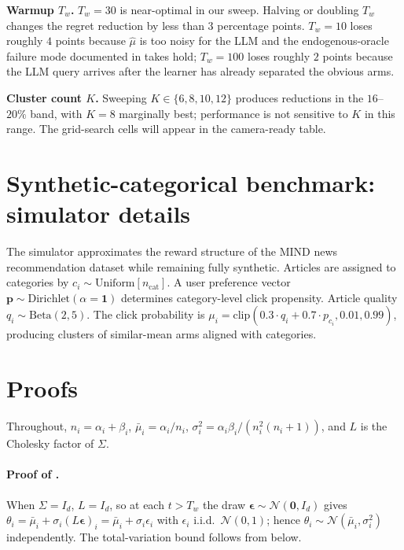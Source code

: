 \documentclass{article}
\theoremstyle{plain}
\theoremstyle{definition}
\theoremstyle{remark}
\begin{document}
\textbf{Warmup $T_w$.}
$T_w = 30$ is near-optimal in our sweep.
Halving or doubling $T_w$ changes the regret reduction by less than $3$ percentage points.
$T_w = 10$ loses roughly $4$ points because $\hat\mu$ is too noisy for the LLM and the endogenous-oracle failure mode documented in  takes hold; $T_w = 100$ loses roughly $2$ points because the LLM query arrives after the learner has already separated the obvious arms.

\textbf{Cluster count $K$.}
Sweeping $K \in \{6, 8, 10, 12\}$ produces reductions in the $16$--$20\%$ band, with $K = 8$ marginally best; performance is not sensitive to $K$ in this range.
The grid-search cells will appear in the camera-ready table.

\section{Synthetic-categorical benchmark: simulator details}\label{app:mindds}

The simulator approximates the reward structure of the MIND news recommendation dataset \citep{wu2020mind} while remaining fully synthetic.
Articles are assigned to categories by $c_i \sim \text{Uniform}[n_\text{cat}]$.
A user preference vector $\mathbf{p} \sim \text{Dirichlet}(\alpha = \mathbf{1})$ determines category-level click propensity.
Article quality $q_i \sim \text{Beta}(2, 5)$.
The click probability is $\mu_i = \text{clip}(0.3 \cdot q_i + 0.7 \cdot p_{c_i}, 0.01, 0.99)$, producing clusters of similar-mean arms aligned with categories.

\section{Proofs}\label{app:proofs}

Throughout, $n_i = \alpha_i + \beta_i$, $\bar\mu_i = \alpha_i / n_i$, $\sigma_i^2 = \alpha_i \beta_i / (n_i^2 (n_i + 1))$, and $L$ is the Cholesky factor of $\Sigma$.

\paragraph{Proof of .}
When $\Sigma = I_d$, $L = I_d$, so at each $t > T_w$ the draw $\boldsymbol{\epsilon} \sim \mathcal{N}(\mathbf{0}, I_d)$ gives $\theta_i = \bar\mu_i + \sigma_i (L\boldsymbol{\epsilon})_i = \bar\mu_i + \sigma_i \epsilon_i$ with $\epsilon_i$ i.i.d.\ $\mathcal{N}(0,1)$; hence $\theta_i \sim \mathcal{N}(\bar\mu_i, \sigma_i^2)$ independently.
The total-variation bound follows from  below.
\end{document}
